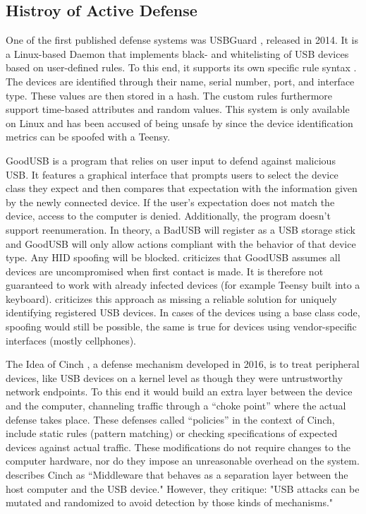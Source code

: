\subsection{Histroy of Active Defense}

One of the first published defense systems was USBGuard \cite{HomeUSBGuard}, released in 2014. It is a Linux-based Daemon that implements black- and whitelisting of USB devices based on user-defined rules. To this end, it supports its own specific rule syntax \cite{RuleLanguageUSBGuard}. The devices are identified through their name, serial number, port, and interface type. These values are then stored in a hash. The custom rules furthermore support time-based attributes and random values. This system is only available on Linux and has been accused of being unsafe by \cite{farhiMalboardNovelUser2019} since the device identification metrics can be spoofed with a Teensy. 

GoodUSB \cite{tianDefendingMaliciousUSB2015} is a program that relies on user input to defend against malicious USB. It features a graphical interface that prompts users to select the device class they expect and then compares that expectation with the information given by the newly connected device. If the user's expectation does not match the device, access to the computer is denied. Additionally, the program doesn't support reenumeration. In theory, a BadUSB will register as a USB storage stick and GoodUSB will only allow actions compliant with the behavior of that device type. Any HID spoofing will be blocked. 
\cite{nissimUSBbasedAttacks2017} criticizes that GoodUSB assumes all devices are uncompromised when first contact is made. It is therefore not guaranteed to work with already infected devices (for example Teensy built into a keyboard). 
\cite{mohammadmoradiMakingWhitelistingBasedDefense2018} criticizes this approach as missing a reliable solution for uniquely identifying registered USB devices. In cases of the devices using a base class code, spoofing would still be possible, the same is true for devices using vendor-specific interfaces (mostly cellphones). 

The Idea of Cinch \cite{angelDefendingMaliciousPeripherals2016}, a defense mechanism developed in 2016, is to treat peripheral devices, like USB devices on a kernel level as though they were untrustworthy network endpoints. To this end it would build an extra layer between the device and the computer, channeling traffic through a ``choke point'' where the actual defense takes place. These defenses called ``policies'' in the context of Cinch, include static rules (pattern matching) or checking specifications of expected devices against actual traffic. 
These modifications do not require changes to the computer hardware, nor do they impose an unreasonable overhead on the system.
\cite{farhiMalboardNovelUser2019} describes Cinch as ``Middleware that behaves as a separation layer between the host computer and the USB device." However, they critique: "USB attacks can be mutated and randomized to avoid detection by those kinds of mechanisms." \cite[p.~7]{farhiMalboardNovelUser2019}


